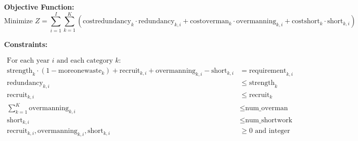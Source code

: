 \documentclass{article}
\begin{document}
\textbf{Objective Function:}
\[
\text{Minimize } Z = \sum_{i=1}^{I} \sum_{k=1}^{K} \left( \text{costredundancy}_{k} \cdot \text{redundancy}_{k,i} + \text{costoverman}_{k} \cdot \text{overmanning}_{k,i} + \text{costshort}_{k} \cdot \text{short}_{k,i} \right)
\]

\textbf{Constraints:}

\begin{align*}
\text{For each year } i \text{ and each category } k: \\
\text{strength}_{k} \cdot (1 - \text{moreonewaste}_{k}) + \text{recruit}_{k,i} + \text{overmanning}_{k,i} - \text{short}_{k,i} & = \text{requirement}_{k,i} \\
\text{redundancy}_{k,i} & \leq \text{strength}_{k} \\
\text{recruit}_{k,i} & \leq \text{recruit}_{k} \\
\sum_{k=1}^{K} \text{overmanning}_{k,i} & \leq \text{num\_overman} \\
\text{short}_{k,i} & \leq \text{num\_shortwork} \\
\text{recruit}_{k,i}, \text{overmanning}_{k,i}, \text{short}_{k,i} & \geq 0 \text{ and integer}
\end{align*}
\end{document}
